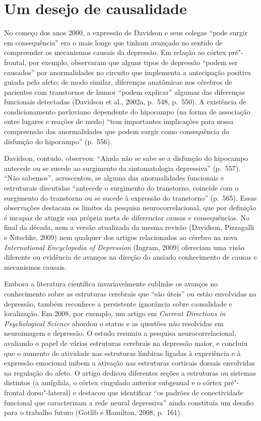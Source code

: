 \chapter{Um desejo de causalidade}

No começo dos anos 2000, a expressão de Davidson e seus colegas ``pode
surgir em consequência'' era o mais longe que tinham avançado no sentido
de compreender os mecanismos causais da depressão. Em relação ao córtex
pré"-frontal, por exemplo, observaram que alguns tipos de depressão
``podem ser causados'' por anormalidades no circuito que implementa a
antecipação positiva guiada pelo afeto; de modo similar, diferenças
anatômicas nos cérebros de pacientes com transtornos de humor ``podem
explicar'' algumas das diferenças funcionais detectadas (Davidson et
al., 2002a, p.~548, p.~550). A existência de condicionamento pavloviano
dependente do hipocampo (na forma de associação entre lugares e reações
de medo) ``tem importantes implicações para nossa compreensão das
anormalidades que podem surgir como consequência da disfunção do
hipocampo'' (p.~556).

Davidson, contudo, observou: ``Ainda não se sabe se a disfunção do
hipocampo antecede ou se sucede ao surgimento da sintomatologia
depressiva'' (p.~557). ``Não sabemos'', acrescentou, se alguma das
anormalidades funcionais e estruturais discutidas ``antecede o
surgimento do transtorno, coincide com o surgimento do transtorno ou se
sucede à expressão do transtorno'' (p.~565). Essas observações destacam
os limites da pesquisa neurocorrelacional, que por definição é incapaz
de atingir sua própria meta de diferenciar causas e consequências. No
final da década, nem a versão atualizada da mesma revisão (Davidson,
Pizzagalli e Nitschke, 2009) nem qualquer dos artigos relacionados ao
cérebro na nova \emph{International Encyclopedia of Depression} (Ingram,
2009) ofereciam uma visão diferente ou evidência de avanços na direção
do ansiado conhecimento de causas e mecanismos causais.

Embora a literatura científica invariavelmente sublinhe os avanços no
conhecimento sobre as estruturas cerebrais que ``são úteis'' ou estão
envolvidas na depressão, também reconhece a persistente ignorância sobre
causalidade e localização. Em 2008, por exemplo, um artigo em
\emph{Current Directions in Psychological Science} abordou o status e as
questões não resolvidas em neuroimagem e depressão. O estudo resumiu a
pesquisa neurocorrelacional, avaliando o papel de várias estruturas
cerebrais na depressão maior, e concluiu que o aumento de atividade nas
estruturas límbicas ligadas à experiência e à expressão emocional inibem
a ativação nas estruturas corticais dorsais envolvidas na regulação do
afeto. O artigo dedicou diferentes seções a estruturas ou sistemas
distintos (a amígdala, o córtex cingulado anterior subgenual e o córtex
pré"-frontal dorso"-lateral) e destacou que identificar ``os padrões de
conectividade funcional que caracterizam a rede neural depressiva''
ainda constituía um desafio para o trabalho futuro (Gotlib e Hamilton,
2008, p.~161).

